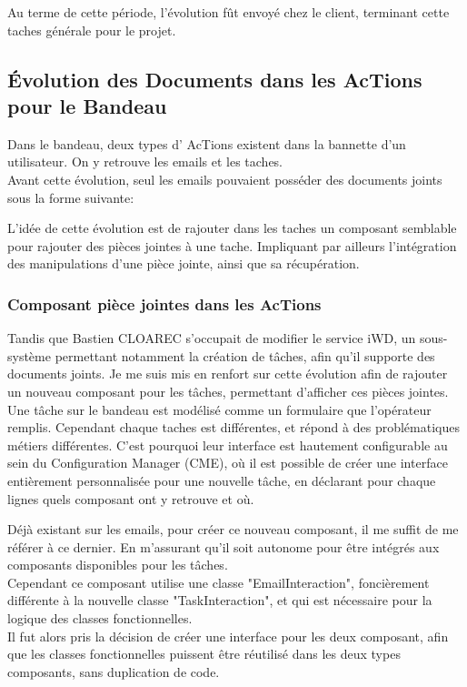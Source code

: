 \documentclass{rapport}
\begin{document}
Au terme de cette période, l'évolution fût envoyé chez le client, terminant cette taches générale pour le projet.

\newpage
\subsection{Évolution des Documents dans les AcTions pour le Bandeau}

Dans le bandeau, deux types d' AcTions existent dans la bannette d'un utilisateur. On y retrouve les emails et les taches.\\
Avant cette évolution, seul les emails pouvaient posséder des documents joints sous la forme suivante:


L'idée de cette évolution est de rajouter dans les taches un composant semblable pour rajouter des pièces jointes à une tache. Impliquant par ailleurs l'intégration des manipulations d'une pièce jointe, ainsi que sa récupération.\\

\subsubsection{Composant pièce jointes dans les AcTions}

Tandis que Bastien CLOAREC s'occupait de modifier le service iWD, un sous-système permettant notamment la création de tâches, afin qu'il supporte des documents joints. Je me suis mis en renfort sur cette évolution afin de rajouter un nouveau composant pour les tâches, permettant d'afficher ces pièces jointes.\\

Une tâche sur le bandeau est modélisé comme un formulaire que l'opérateur remplis. Cependant chaque taches est différentes, et répond à des problématiques métiers différentes. C'est pourquoi leur interface est hautement configurable au sein du Configuration Manager (CME), où il est possible de créer une interface entièrement personnalisée pour une nouvelle tâche, en déclarant pour chaque lignes quels composant ont y retrouve et où.


Déjà existant sur les emails, pour créer ce nouveau composant, il me suffit de me référer à ce dernier. En m'assurant qu'il soit autonome pour être intégrés aux composants disponibles pour les tâches.\\
Cependant ce composant utilise une classe "EmailInteraction", foncièrement différente à la nouvelle classe "TaskInteraction", et qui est nécessaire pour la logique des classes fonctionnelles.\\
Il fut alors pris la décision de créer une interface pour les deux composant, afin que les classes fonctionnelles puissent être réutilisé dans les deux types composants, sans duplication de code. \\
\end{document}
